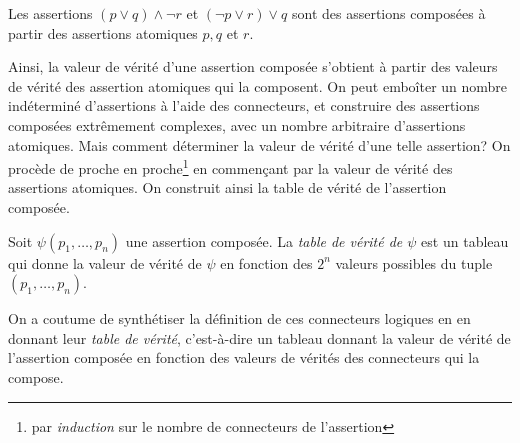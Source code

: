 \documentclass[french,course,oneside,theoremnosection]{lecture}
\begin{document}
\begin{example}

Les assertions  $(p\vee q) \wedge \neg r$ et $(\neg p \vee r) \vee q$ sont des assertions composées à partir des assertions atomiques $p,q$ et $r$.
\end{example}

Ainsi, la valeur de vérité d'une assertion composée s'obtient à partir des valeurs de vérité des assertion atomiques qui la composent. On peut emboîter un nombre indéterminé d'assertions à l'aide des connecteurs, et construire des assertions composées extrêmement complexes, avec un nombre arbitraire d'assertions atomiques. Mais comment déterminer la valeur de vérité d'une telle assertion?  On procède de proche en proche\footnote{par \emph{induction} sur le nombre de connecteurs de l'assertion} en commençant par la valeur de vérité des assertions atomiques. On construit ainsi la table de vérité de l'assertion composée.

\begin{definition}
Soit $\psi(p_1, \ldots, p_n)$ une assertion composée. La \emph{table de vérité de $\psi$} est un tableau qui donne la valeur de vérité de $\psi$ en fonction des $2^n$ valeurs possibles du tuple $(p_1, \ldots, p_n)$.
\end{definition}
On a coutume de synthétiser la définition de ces connecteurs logiques en en donnant leur \emph{table de vérité}, c'est-à-dire  un tableau donnant la valeur de vérité de l'assertion composée en fonction des valeurs de vérités des connecteurs qui la compose.
\end{document}
